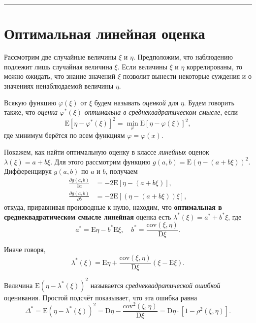 \documentclass[11pt,a4paper]{article}
\begin{document}
    \begin{center}\rule{0.5\linewidth}{0.5pt}\end{center}

    \hypertarget{ux43eux43fux442ux438ux43cux430ux43bux44cux43dux430ux44f-ux43bux438ux43dux435ux439ux43dux430ux44f-ux43eux446ux435ux43dux43aux430}{%
\section{Оптимальная линейная
оценка}\label{ux43eux43fux442ux438ux43cux430ux43bux44cux43dux430ux44f-ux43bux438ux43dux435ux439ux43dux430ux44f-ux43eux446ux435ux43dux43aux430}}

Рассмотрим две случайные величины \(\xi\) и \(\eta\). Предположим, что
наблюдению подлежит лишь случайная величина \(\xi\). Если величины
\(\xi\) и \(\eta\) коррелированы, то можно ожидать, что знание значений
\(\xi\) позволит вынести некоторые суждения и о значениях ненаблюдаемой
величины \(\eta\).

Всякую функцию \(\varphi(\xi)\) от \(\xi\) будем называть \emph{оценкой}
для \(\eta\). Будем говорить также, что \emph{оценка}
\(\varphi^\ast(\xi)\) \emph{оптимальна в среднеквадратическом смысле},
если \[
  \mathrm{E}\left[\eta − \varphi^\ast(\xi)\right]^2 = \min_\varphi \mathrm{E}\left[\eta − \varphi(\xi)\right]^2,
\] где минимум берётся по всем функциям \(\varphi=\varphi(x)\).

Покажем, как найти оптимальную оценку в классе \emph{линейных} оценок
\(\lambda(\xi) = a + b\xi\). Для этого рассмотрим функцию
\(g(a, b) = \mathrm{E}(\eta − (a+b\xi))^2\). Дифференцируя \(g(a, b)\)
по \(a\) и \(b\), получаем \[
\begin{split}
    \frac{\partial g(a, b)}{\partial a} &= −2 \mathrm{E} \left[ \eta − (a+b\xi) \right], \\
    \frac{\partial g(a, b)}{\partial b} &= −2 \mathrm{E} \left[ (\eta − (a+b\xi))\xi \right],
\end{split}
\] откуда, приравнивая производные к нулю, находим, что
\textbf{оптимальная в среднеквадратическом смысле линейная} оценка есть
\(\lambda^\ast (\xi) = a^\ast + b^\ast \xi\), где \[
    a^\ast = \mathrm{E}\eta − b^\ast\mathrm{E}\xi, \quad b^\ast = \frac{\mathrm{cov}(\xi, \eta)}{\mathrm{D}\xi}.
\]

Иначе говоря, \[
    \lambda^\ast(\xi) = \mathrm{E}\eta + \frac{\mathrm{cov}(\xi, \eta)}{\mathrm{D}\xi} (\xi - \mathrm{E}\xi).
\]

Величина \(\mathrm{E}(\eta − \lambda^\ast(\xi))^2\) называется
\emph{среднеквадратической ошибкой} оценивания. Простой подсчёт
показывает, что эта ошибка равна \[
\Delta^\ast = \mathrm{E}(\eta − \lambda^\ast(\xi))^2 = \mathrm{D}\eta − \frac{\mathrm{cov}^2(\xi, \eta)}{\mathrm{D}\xi} = \mathrm{D}\eta \cdot [1 - \rho^2(\xi, \eta)].
\]
\end{document}
